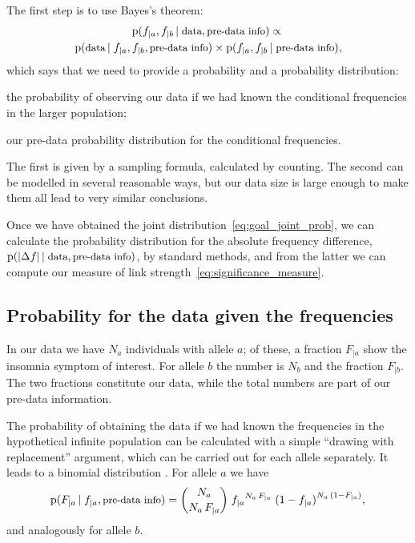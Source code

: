 \documentclass[\ifafour a4paper,12pt,\else a5paper,10pt,\fi%
onecolumn,oneside,article,%
british%
]{memoir}
\theoremstyle{remark}
\theoremstyle{innote}
\DeclarePairedDelimiter\abs{\lvert}{\rvert}
\newcommand*{\pf}{\mathrm{p}}%
\renewcommand*{\|}[1][]{\nonscript\,#1\vert\nonscript\;\mathopen{}}
\newcommand*{\sect}{\S}%
\newcommand*{\chap}{ch.}%
\newcommand*{\ptext}[1]{\text{\small #1}}
\newcommand*{\ya}{a}
\newcommand*{\yb}{b}
\newcommand*{\df}{\Delta f}
\begin{document}
The first step is to use Bayes's theorem:
\begin{multline}
  \label{eq:intuitive_Bayes}
  \pf(f_{|\ya}, f_{|\yb} \| \ptext{data}, \ptext{pre-data info})
  \propto{}\\
  \pf(\ptext{data} \| f_{|\ya}, f_{|\yb}, \ptext{pre-data info})
  \times
  \pf(f_{|\ya}, f_{|\yb} \| \ptext{pre-data info}),
\end{multline}
which says that we need to provide a probability and a probability
distribution:
\begin{enumerate*}[label=(\roman*)]
\item the probability of observing our data if we had known the
  conditional frequencies in the larger population; \item our pre-data
  probability distribution for the conditional frequencies.
\end{enumerate*}
The first is given by a sampling formula, calculated by counting. The
second can be modelled in several reasonable ways, but our data size is
large enough to make them all lead to very similar conclusions.

Once we have obtained the joint distribution~\eqref{eq:goal_joint_prob}, we
can calculate the probability distribution for the absolute frequency
difference, $\pf(\abs{\df} \| \ptext{data}, \ptext{pre-data info})$, by
standard methods, and from the latter we can compute our measure of link
strength~\eqref{eq:significance_measure}.


\subsection{Probability for the data given the frequencies}
\label{sec:p_data_from_freqs}

In our data we have $N_{\ya}$ individuals with allele $\ya$; of these, a
fraction $F_{|\ya}$ show the insomnia symptom of interest. For allele $\yb$
the number is $N_{\yb}$ and the fraction $F_{|\yb}$. The two fractions constitute
our data, while the total numbers are part of our pre-data information.

The probability of obtaining the data if we had known the frequencies in
the hypothetical infinite population can be calculated with a simple
\enquote{drawing with replacement} argument, which can be carried out for
each allele separately. It leads to a binomial distribution
\cites[\chap~3]{jaynes1994_r2003}[\sect~4.6]{ross1976_r2010}[\sect~VI.2]{feller1950_r1968}.
For allele $\ya$ we have
\begin{equation}
  \label{eq:sampling_belief}
  \pf( F_{|\ya} \| f_{|\ya}, \ptext{pre-data info})
  =
\binom{N_{\ya}}{N_{\ya}\,F_{|\ya}}\;  {f_{|\ya}}^{N_{\ya}\,F_{|\ya}} \;
  {(1-f_{|\ya})}^{N_{\ya}\,(1-F_{|\ya})},
\end{equation}
and analogously for allele $\yb$.
\end{document}
